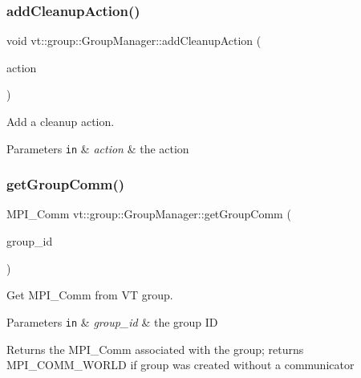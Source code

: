 \subsubsection{\texorpdfstring{add\+Cleanup\+Action()}{addCleanupAction()}}
{\footnotesize\ttfamily void vt\+::group\+::\+Group\+Manager\+::add\+Cleanup\+Action (\begin{DoxyParamCaption}\item[{\hyperlink{namespacevt_ae0a5a7b18cc99d7b732cb4d44f46b0f3}{Action\+Type}}]{action }\end{DoxyParamCaption})}



Add a cleanup action. 


\begin{DoxyParams}[1]{Parameters}
\mbox{\tt in}  & {\em action} & the action \\
\hline
\end{DoxyParams}
\mbox{\label{structvt_1_1group_1_1_group_manager_a15492a3874bd670c18336571e9768e8e}} 
\subsubsection{\texorpdfstring{get\+Group\+Comm()}{getGroupComm()}}
{\footnotesize\ttfamily M\+P\+I\+\_\+\+Comm vt\+::group\+::\+Group\+Manager\+::get\+Group\+Comm (\begin{DoxyParamCaption}\item[{\hyperlink{namespacevt_a27b5e4411c9b6140c49100e050e2f743}{Group\+Type} const}]{group\+\_\+id }\end{DoxyParamCaption})}



Get M\+P\+I\+\_\+\+Comm from VT group. 


\begin{DoxyParams}[1]{Parameters}
\mbox{\tt in}  & {\em group\+\_\+id} & the group ID\\
\hline
\end{DoxyParams}
\begin{DoxyReturn}{Returns}
the M\+P\+I\+\_\+\+Comm associated with the group; returns {\ttfamily M\+P\+I\+\_\+\+C\+O\+M\+M\+\_\+\+W\+O\+R\+LD} if group was created without a communicator 
\end{DoxyReturn}
\mbox{\label{structvt_1_1group_1_1_group_manager_a472e95d136ef71c14ac5b4c931ff79b9}} 

